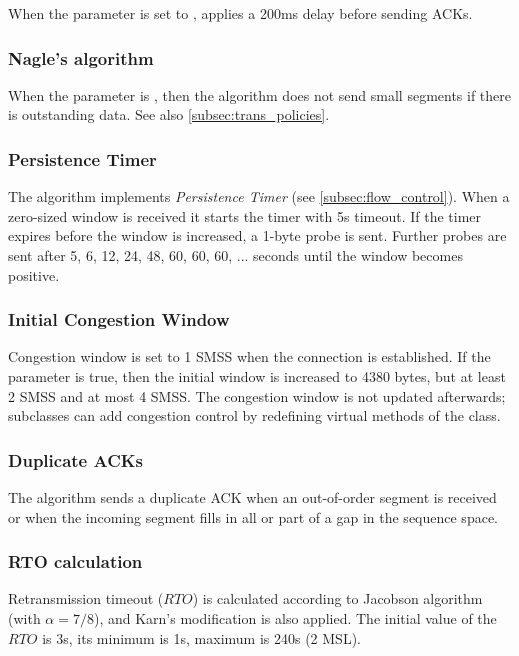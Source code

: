 When the  parameter is set to ,
 applies a 200ms delay before sending ACKs.

\subsubsection*{Nagle's algorithm}

When the  parameter is , then
the algorithm does not send small segments if there is outstanding
data. See also \ref{subsec:trans_policies}.

\subsubsection*{Persistence Timer}

The algorithm implements \emph{Persistence Timer} (see \ref{subsec:flow_control}).
When a zero-sized window is received it starts the timer with 5s timeout.
If the timer expires before the window is increased, a 1-byte probe is
sent. Further probes are sent after 5, 6, 12, 24, 48, 60, 60, 60, ...
seconds until the window becomes positive.

\subsubsection*{Initial Congestion Window} 

Congestion window is set to 1 SMSS when the connection is established.
If the  parameter is true, then the initial
window is increased to 4380 bytes, but at least 2 SMSS and at most 4 SMSS.
The congestion window is not updated afterwards; subclasses can
add congestion control by redefining virtual methods of the
 class.

\subsubsection*{Duplicate ACKs}

The algorithm sends a duplicate ACK when an out-of-order
segment is received or when the incoming segment fills in all
or part of a gap in the sequence space.

\subsubsection*{RTO calculation}

Retransmission timeout ($RTO$) is calculated according to
Jacobson algorithm (with $\alpha=7/8$), and Karn's modification is also applied.
The initial value of the $RTO$ is 3s, its minimum is 1s,
maximum is 240s (2 MSL).

